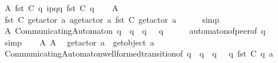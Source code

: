 \begin{isabellebody}
\ A{}{\isacharcolon}{\kern0pt}\ {\isachardoublequoteopen}fst\ {\isacharparenleft}{\kern0pt}C{}\ q{\isacharparenright}{\kern0pt}\ {\isasymmidarrow}{\isacharquery}{\kern0pt}{\isasymlangle}{\isacharparenleft}{\kern0pt}i\isactrlbsup p{\isasymrightarrow}q\isactrlesup {\isacharparenright}{\kern0pt}{\isasymrangle}{\isasymrightarrow}q\ {\isacharparenleft}{\kern0pt}fst\ {\isacharparenleft}{\kern0pt}C{}\ q{\isacharparenright}{\kern0pt}{\isacharparenright}{\kern0pt}{\isachardoublequoteclose}\isanewline
\ \ \isamarkupfalse%
\ A{}\ \isamarkupfalse%
\ {\isachardoublequoteopen}fst\ {\isacharparenleft}{\kern0pt}C{}\ {\isacharparenleft}{\kern0pt}get{\isacharunderscore}{\kern0pt}actor\ a{\isacharparenright}{\kern0pt}{\isacharparenright}{\kern0pt}\ {\isasymmidarrow}a{\isasymrightarrow}{\isacharparenleft}{\kern0pt}get{\isacharunderscore}{\kern0pt}actor\ a{\isacharparenright}{\kern0pt}\ {\isacharparenleft}{\kern0pt}fst\ {\isacharparenleft}{\kern0pt}C{}\ {\isacharparenleft}{\kern0pt}get{\isacharunderscore}{\kern0pt}actor\ a{\isacharparenright}{\kern0pt}{\isacharparenright}{\kern0pt}{\isacharparenright}{\kern0pt}{\isachardoublequoteclose}\isanewline
\ \ \ \ \isamarkupfalse%
\ simp\isanewline
\ \ \isamarkupfalse%
\ A{}{\isacharcolon}{\kern0pt}\ {\isachardoublequoteopen}CommunicatingAutomaton\ q\ {\isacharparenleft}{\kern0pt}{\isasymS}\ q{\isacharparenright}{\kern0pt}\ {\isacharparenleft}{\kern0pt}{\isasymI}\ q{\isacharparenright}{\kern0pt}\ {\isasymM}\ {\isacharparenleft}{\kern0pt}{\isasymR}\ q{\isacharparenright}{\kern0pt}{\isachardoublequoteclose}\isanewline
\ \ \ \ \isamarkupfalse%
\ automaton{\isacharunderscore}{\kern0pt}of{\isacharunderscore}{\kern0pt}peer{\isacharbrackleft}{\kern0pt}of\ q{\isacharbrackright}{\kern0pt}\isanewline
\ \ \ \ \isamarkupfalse%
\ simp\isanewline
\ \ \isamarkupfalse%
\ A{}\ A{}\ \isamarkupfalse%
\ {\isachardoublequoteopen}get{\isacharunderscore}{\kern0pt}actor\ a\ {\isasymnoteq}\ get{\isacharunderscore}{\kern0pt}object\ a{\isachardoublequoteclose}\isanewline
\ \ \ \ \isamarkupfalse%
\ CommunicatingAutomaton{\isachardot}{\kern0pt}well{\isacharunderscore}{\kern0pt}formed{\isacharunderscore}{\kern0pt}transition{\isacharbrackleft}{\kern0pt}of\ q\ {\isachardoublequoteopen}{\isasymS}\ q{\isachardoublequoteclose}\ {\isachardoublequoteopen}{\isasymI}\ q{\isachardoublequoteclose}\ {\isasymM}\ {\isachardoublequoteopen}{\isasymR}\ q{\isachardoublequoteclose}\ {\isachardoublequoteopen}fst\ {\isacharparenleft}{\kern0pt}C{}\ q{\isacharparenright}{\kern0pt}{\isachardoublequoteclose}\ a\isanewline

\end{isabellebody}
